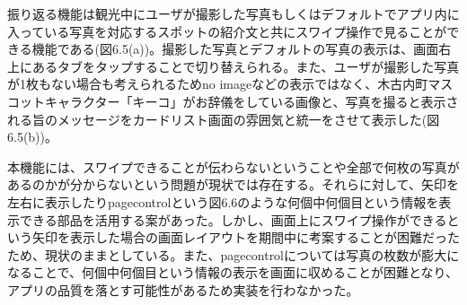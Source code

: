振り返る機能は観光中にユーザが撮影した写真もしくはデフォルトでアプリ内に入っている写真を対応するスポットの紹介文と共にスワイプ操作で見ることができる機能である(図6.5(a))。撮影した写真とデフォルトの写真の表示は、画面右上にあるタブをタップすることで切り替えられる。また、ユーザが撮影した写真が1枚もない場合も考えられるためno imageなどの表示ではなく、木古内町マスコットキャラクター「キーコ」がお辞儀をしている画像と、写真を撮ると表示される旨のメッセージをカードリスト画面の雰囲気と統一をさせて表示した(図6.5(b))。\par
本機能には、スワイプできることが伝わらないということや全部で何枚の写真があるのかが分からないという問題が現状では存在する。それらに対して、矢印を左右に表示したりpagecontrolという図6.6のような何個中何個目という情報を表示できる部品を活用する案があった。しかし、画面上にスワイプ操作ができるという矢印を表示した場合の画面レイアウトを期間中に考案することが困難だったため、現状のままとしている。また、pagecontrolについては写真の枚数が膨大になることで、何個中何個目という情報の表示を画面に収めることが困難となり、アプリの品質を落とす可能性があるため実装を行わなかった。

\newpage

